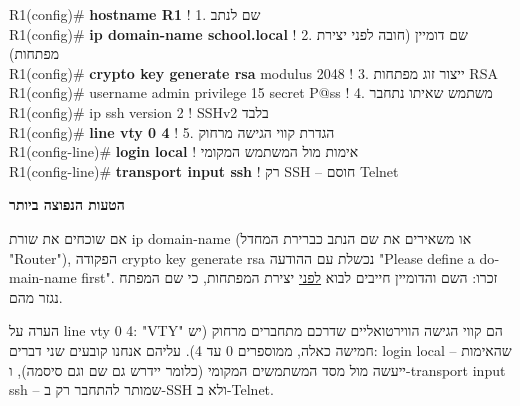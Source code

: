 \documentclass[11pt]{article}
\newcommand{\enLR}[1]{\textenglish{#1}}
\newcommand{\code}[1]{\textenglish{\codefont #1}}
\newcommand{\boxtitle}[1]{{\bfseries\color{boxti}#1}}
\newenvironment{mistakebox}{\colorlet{boxti}{misti}\begin{mdframed}[backgroundcolor=misbg,linecolor=misfr,rightline=true,leftline=false,topline=false,bottomline=false,linewidth=2pt,innertopmargin=6pt,innerbottommargin=6pt,innerleftmargin=8pt,innerrightmargin=8pt,skipabove=6pt,skipbelow=6pt]}{\end{mdframed}}
\begin{document}
\begin{codebox}\begin{english}\codefont\footnotesize\color{cfg}\setlength{\parindent}{0pt}
R1(config)\# \textcolor{cbold}{\textbf{hostname R1}}                       \textcolor{ccom}{\texthebrew{! \enLR{1.} שם לנתב}}\\
R1(config)\# \textcolor{cbold}{\textbf{ip domain-name school.local}}       \textcolor{ccom}{\texthebrew{! \enLR{2.} שם דומיין (חובה לפני יצירת מפתחות)}}\\
R1(config)\# \textcolor{cbold}{\textbf{crypto key generate rsa}} modulus 2048  \textcolor{ccom}{\texthebrew{! \enLR{3.} ייצור זוג מפתחות \enLR{RSA}}}\\
R1(config)\# username admin privilege 15 secret P@ss \textcolor{ccom}{\texthebrew{! \enLR{4.} משתמש שאיתו נתחבר}}\\
R1(config)\# ip ssh version 2                         \textcolor{ccom}{\texthebrew{! \enLR{SSHv2} בלבד}}\\
R1(config)\# \textcolor{cbold}{\textbf{line vty 0 4}}                          \textcolor{ccom}{\texthebrew{! \enLR{5.} הגדרת קווי הגישה מרחוק}}\\
R1(config-line)\# \textcolor{cbold}{\textbf{login local}}                      \textcolor{ccom}{\texthebrew{! אימות מול המשתמש המקומי}}\\
R1(config-line)\# \textcolor{cbold}{\textbf{transport input ssh}}              \textcolor{ccom}{\texthebrew{! רק \enLR{SSH} – חוסם \enLR{Telnet}}}
\end{english}\end{codebox}

\begin{mistakebox}\boxtitle{הטעות הנפוצה ביותר}\par  אם שוכחים את שורת \code{ip domain-name} (או משאירים את שם הנתב כברירת המחדל "\enLR{Router")}, הפקודה \code{crypto key generate rsa} נכשלת עם ההודעה "\enLR{Please define a domain-name first".} זכרו: השם והדומיין חייבים לבוא \underline{לפני} יצירת המפתחות, כי שם המפתח נגזר מהם.\end{mistakebox}

הערה על \code{line vty 0 4}: "\enLR{VTY"} הם קווי הגישה הווירטואליים שדרכם מתחברים מרחוק (יש חמישה כאלה, ממוספרים \enLR{0} עד \enLR{4).} עליהם אנחנו קובעים שני דברים: \code{login local} – שהאימות ייעשה מול מסד המשתמשים המקומי (כלומר יידרש גם שם וגם סיסמה), ו-\code{transport input ssh} – שמותר להתחבר רק ב-\enLR{SSH} ולא ב-\enLR{Telnet.}\par
\end{document}
